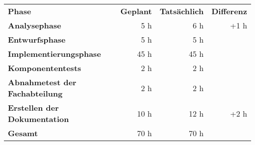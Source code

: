 \begin{tabular}{lrrr}
\rowcolor{heading}\textbf{Phase} & \textbf{Geplant} & \textbf{Tatsächlich} & \textbf{Differenz} \\
\textbf{Analysephase} & 5 h   & 6 h  & +1 h \\
\rowcolor{odd}\textbf{Entwurfsphase} & 5 h  & 5 h  &  \\
\textbf{Implementierungsphase} & 45 h  & 45 h  &  \\
\rowcolor{odd}\textbf{Komponententests} & 2 h   & 2 h   &  \\
\textbf{Abnahmetest der Fachabteilung} & 2 h   & 2 h   &  \\
\rowcolor{odd}\textbf{Erstellen der Dokumentation} & 10 h   & 12 h  & +2 h \\
\hline
\hline
\rowcolor{odd}\textbf{Gesamt} & 70 h  & 70 h  &  \\
\end{tabular}
